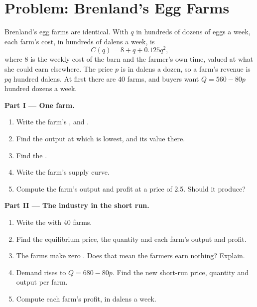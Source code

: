 \section{Problem: Brenland's Egg Farms}

\begin{problem}
\label{pb:g11:perfect-competition:1}
Brenland's egg farms are identical. With $q$ in hundreds of dozens of eggs a week, each farm's cost, in hundreds of dalens a week, is
\[
C(q) = 8 + q + 0.125q^2,
\]
where 8 is the weekly cost of the barn and the farmer's own time, valued at what she could earn elsewhere. The price $p$ is in dalens a dozen, so a farm's revenue
is $pq$ hundred dalens. At first there are 40 farms, and buyers want $Q = 560 - 80p$ hundred dozens a week.

\medskip
\noindent\textbf{Part I --- One farm.}
\begin{enumerate}
\item Write the farm's ,  and .
\item Find the output at which  is lowest, and its value there.
\item Find the .
\item Write the farm's supply curve.
\item Compute the farm's output and profit at a price of 2.5. Should it produce?
\end{enumerate}

\medskip
\noindent\textbf{Part II --- The industry in the short run.}
\begin{enumerate}[resume]
\item Write the  with 40 farms.
\item Find the equilibrium price, the quantity and each farm's output and profit.
\item The farms make zero . Does that mean the farmers earn nothing? Explain.
\item Demand rises to $Q = 680 - 80p$. Find the new short-run price, quantity and output per farm.
\item Compute each farm's profit, in dalens a week.
\end{enumerate}


\end{problem}
